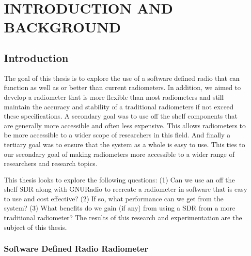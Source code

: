\chapter{INTRODUCTION AND  BACKGROUND}




\section{Introduction}
The goal of this thesis is to explore the use of a software defined radio that can function as well as or better than current radiometers.  In addition, we aimed to develop a radiometer that is more flexible than most radiometers and still maintain the accuracy and stability of a traditional radiometers if not exceed these specifications.  A secondary goal was to use off the shelf components that are generally more accessible and often less expensive.  This allows radiometers to be more accessible to a wider scope of researchers in this field.  And finally a tertiary goal was to ensure that the system as a whole is easy to use.  This ties to our secondary goal of making radiometers more accessible to a wider range of researchers and research topics.

This thesis looks to explore the following questions: (1) Can we use an off the shelf SDR along with GNURadio to recreate a radiometer in software that is easy to use and cost effective?  (2) If so, what performance can we get from the system?  (3) What benefits do we gain (if any) from using a SDR from a more traditional radiometer? The results of this research and experimentation are the subject of this thesis.


\subsection{Software Defined Radio Radiometer}

